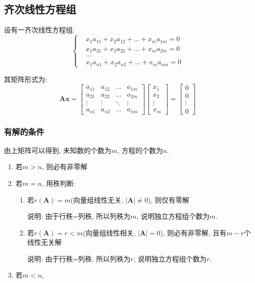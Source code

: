 \subsection{齐次线性方程组}
设有一齐次线性方程组:
\begin{equation*}
\left\{
\begin{aligned}
& x_{1}a_{11}+x_{2}a_{12}+...+x_{m}a_{1m}=0 \\
& x_{1}a_{21}+x_{2}a_{22}+...+x_{m}a_{2m}=0 \\
& \dots \\
& x_{1}a_{n1}+x_{2}a_{n2}+...+x_{m}a_{nm}=0
\end{aligned}
\right.
\end{equation*}\par
其矩阵形式为:
\begin{equation*}
\bm{A}\bm{x}=
\begin{bmatrix}
a_{11} & a_{12} & \dots & a_{1m} \\
a_{21} & a_{22} & \dots & a_{2m} \\
\vdots & \vdots & \ddots & \vdots \\
a_{n1} & a_{n2} & \dots & a_{nm}
\end{bmatrix}
\begin{bmatrix}
x_{1} \\
x_{2} \\
\vdots \\
x_{m}
\end{bmatrix}=
\begin{bmatrix}
0 \\
0 \\
\vdots \\
0
\end{bmatrix}
\end{equation*}
\subsubsection{有解的条件}
由上矩阵可以得到, 未知数的个数为$ m $, 方程的个数为$ n $.
\begin{enumerate}
\item 若$ m>n $, 则必有非零解
\item 若$ m=n $, 用秩判断:
\begin{enumerate}
\item 若$ r(\bm{A})=m $(向量组线性无关, $ |\bm{A}|\neq 0 $), 则仅有零解 \par
说明: 由于行秩=列秩, 所以列秩为$ m $, 说明独立方程组个数为$ m $.
\item 若$ r(\bm{A})=r<m $(向量组线性相关, $ |\bm{A}| = 0 $), 则必有非零解, 且有$ m-r $个线性无关解 \par
说明: 由于行秩=列秩, 所以列秩为$ r $, 说明独立方程组个数为$ r $.
\end{enumerate}
\item 若$ m<n $,
\end{enumerate}
